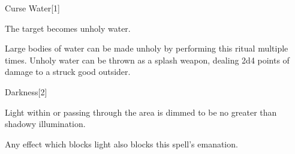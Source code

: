 \begin{spellsection}{Curse Water}[1]
    \begin{spellheader}
    \end{spellheader}
    \begin{spellcontent}
        \begin{spelltargetinginfo}
        \end{spelltargetinginfo}
        \begin{spelleffects}

            \spelleffect The target becomes unholy water.
        \end{spelleffects}
    \end{spellcontent}
    \begin{spellfooter}
        \spellnotes Large bodies of water can be made unholy by performing this ritual multiple times. Unholy water can be thrown as a splash weapon, dealing 2d4 points of damage to a struck good outsider.
    \end{spellfooter}
\end{spellsection}

\begin{spellsection}{Darkness}[2]
    \begin{spellheader}
    \end{spellheader}
    \begin{spellcontent}
        \begin{spelltargetinginfo}
            \spellrng{\rngtouch}
        \end{spelltargetinginfo}
        \begin{spelleffects}

            \spellline
            \spelleffect Light within or passing through the area is dimmed to be no greater than shadowy illumination.
            \spelldur \durlong \dismissable
        \end{spelleffects}
    \end{spellcontent}
    \begin{spellfooter}
        \spellnotes Any effect which blocks light also blocks this spell's emanation.
    \end{spellfooter}
\end{spellsection}


